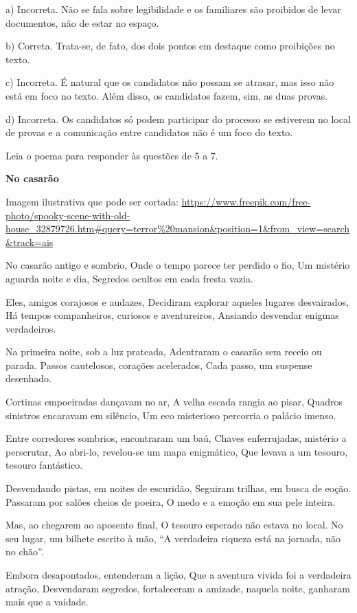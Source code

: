 a) Incorreta. Não se fala sobre legibilidade e os familiares são
proibidos de levar documentos, não de estar no espaço.

b) Correta. Trata-se, de fato, dos dois pontos em destaque como
proibições no texto.

c) Incorreta. É natural que os candidatos não possam se atrasar, mas
isso não está em foco no texto. Além disso, os candidatos fazem, sim, as
duas provas.

d) Incorreta. Os candidatos só podem participar do processo se estiverem
no local de provas e a comunicação entre candidatos não é um foco do
texto.

Leia o poema para responder às questões de 5 a 7.

\textbf{No casarão}

Imagem ilustrativa que pode ser cortada:
\url{https://www.freepik.com/free-photo/spooky-scene-with-old-house_32879726.htm\#query=terror\%20mansion\&position=1\&from_view=search\&track=ais}

No casarão antigo e sombrio, Onde o tempo parece ter perdido o fio, Um
mistério aguarda noite e dia, Segredos ocultos em cada fresta vazia.

Eles, amigos corajosos e audazes, Decidiram explorar aqueles lugares
desvairados, Há tempos companheiros, curiosos e aventureiros, Ansiando
desvendar enigmas verdadeiros.

Na primeira noite, sob a luz prateada, Adentraram o casarão sem receio
ou parada. Passos cautelosos, corações acelerados, Cada passo, um
suspense desenhado.

Cortinas empoeiradas dançavam no ar, A velha escada rangia ao pisar,
Quadros sinistros encaravam em silêncio, Um eco misterioso percorria o
palácio imenso.

Entre corredores sombrios, encontraram um baú, Chaves enferrujadas,
mistério a perscrutar, Ao abri-lo, revelou-se um mapa enigmático, Que
levava a um tesouro, tesouro fantástico.

Desvendando pistas, em noites de escuridão, Seguiram trilhas, em busca
de eoção. Passaram por salões cheios de poeira, O medo e a emoção em sua
pele inteira.

Mas, ao chegarem ao aposento final, O tesouro esperado não estava no
local. No seu lugar, um bilhete escrito à mão, ``A verdadeira riqueza
está na jornada, não no chão''.

Embora desapontados, entenderam a lição, Que a aventura vivida foi a
verdadeira atração, Desvendaram segredos, fortaleceram a amizade,
naquela noite, ganharam mais que a vaidade.

